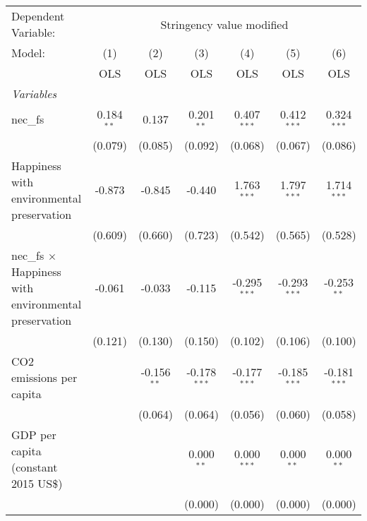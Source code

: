 
\begingroup
\centering
\begin{tabular}{lcccccc}
   \toprule
   Dependent Variable: & \multicolumn{6}{c}{Stringency value modified}\\
   Model:                                                       & (1)          & (2)           & (3)            & (4)            & (5)            & (6)\\  
                                                                &  OLS         & OLS           & OLS            & OLS            & OLS            & OLS\\  
   \midrule
   \emph{Variables}\\
   nec\_fs                                                      & 0.184$^{**}$ & 0.137         & 0.201$^{**}$   & 0.407$^{***}$  & 0.412$^{***}$  & 0.324$^{***}$\\   
                                                                & (0.079)      & (0.085)       & (0.092)        & (0.068)        & (0.067)        & (0.086)\\   
   Happiness with environmental preservation                    & -0.873       & -0.845        & -0.440         & 1.763$^{***}$  & 1.797$^{***}$  & 1.714$^{***}$\\   
                                                                & (0.609)      & (0.660)       & (0.723)        & (0.542)        & (0.565)        & (0.528)\\   
   nec\_fs $\times$ Happiness with environmental preservation   & -0.061       & -0.033        & -0.115         & -0.295$^{***}$ & -0.293$^{***}$ & -0.253$^{**}$\\   
                                                                & (0.121)      & (0.130)       & (0.150)        & (0.102)        & (0.106)        & (0.100)\\   
   CO2 emissions per capita                                     &              & -0.156$^{**}$ & -0.178$^{***}$ & -0.177$^{***}$ & -0.185$^{***}$ & -0.181$^{***}$\\   
                                                                &              & (0.064)       & (0.064)        & (0.056)        & (0.060)        & (0.058)\\   
   GDP per capita (constant 2015 US\$)                          &              &               & 0.000$^{**}$   & 0.000$^{***}$  & 0.000$^{**}$   & 0.000$^{**}$\\   
                                                                &              &               & (0.000)        & (0.000)        & (0.000)        & (0.000)\\   

\end{tabular}
